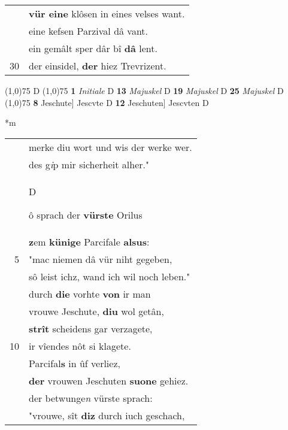\documentclass[8pt,a4paper,notitlepage]{article}
\begin{document}
\begin{table}[ht]
\begin{minipage}[t]{0.5\linewidth}
\begin{tabular}{rl}
 & \textbf{vür eine} klôsen in eines velses want.\\ 
 & eine kefsen Parzival dâ vant.\\ 
 & ein gemâlt sper dâr bî \textbf{dâ} lent.\\ 
30 & der einsidel, \textbf{der} hiez Trevrizent.\\ 
\end{tabular}
\scriptsize
\line(1,0){75} \newline
D \newline
\line(1,0){75} \newline
\textbf{1} \textit{Initiale} D  \textbf{13} \textit{Majuskel} D  \textbf{19} \textit{Majuskel} D  \textbf{25} \textit{Majuskel} D  \newline
\line(1,0){75} \newline
\textbf{8} Jeschute] Jescvte D \textbf{12} Jeschuten] Jescvten D \newline
\end{minipage}
\hspace{0.5cm}
\begin{minipage}[t]{0.5\linewidth}
\small
\begin{center}*m
\end{center}
\begin{tabular}{rl}
 & merke diu wort und wis der werke wer.\\ 
 & des g\textit{i}p mir sicherheit alher."\\ 
 & \begin{large}D\end{large}ô sprach der \textbf{vürste} Orilus\\ 
 & \textbf{z}em \textbf{künige} Parcifale \textbf{alsus}:\\ 
5 & "mac niemen dâ vür niht gegeben,\\ 
 & sô leist ichz, wand ich wil noch leben."\\ 
 & durch \textbf{die} vorhte \textbf{von} ir man\\ 
 & vrouwe Jeschute, \textbf{diu} wol getân,\\ 
 & \textbf{strît} scheidens gar verzagete,\\ 
10 & ir vîendes nôt si klagete.\\ 
 & Parcifal\textbf{s}  in ûf verliez,\\ 
 & \textbf{der} vrouwen Jeschuten \textbf{suone} gehiez.\\ 
 & der betwunge\textit{n} vürste sprach:\\ 
 & "vrouwe, sît \textbf{diz} durch iuch geschach,\\ 

\end{tabular}
\end{minipage}
\end{table}
\end{document}
